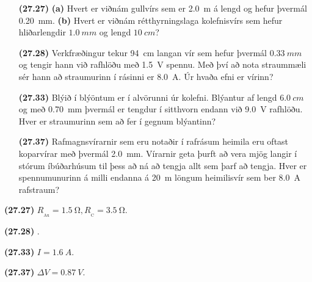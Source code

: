 \ifdefined \wholebook \else\documentclass[oneside]{book}\usepackage{EdlBook}\graphicspath{{figures/}}
\begin{document}
\begin{enumerate}[label = \textbf{(\alph*)}]

\item[\textbf{(27.27)}] \textbf{(a)} Hvert er viðnám gullvírs sem er \SI{2.0}{m} á lengd og hefur þvermál \SI{0.20}{mm}. \textbf{(b)} Hvert er viðnám rétthyrningslaga kolefnisvírs sem hefur hliðarlengdir $\SI{1.0}{mm}$ og lengd $\SI{10}{cm}$? 

\item[\textbf{(27.28)}] Verkfræðingur tekur \SI{94}{cm} langan vír sem hefur þvermál $\SI{0.33}{mm}$ og tengir hann við rafhlöðu með \SI{1.5}{V} spennu. Með því að nota straummæli sér hann að straumurinn í rásinni er \SI{8.0}{A}. Úr hvaða efni er vírinn?

\item[\textbf{(27.33)}] Blýið í blýöntum er í alvörunni úr kolefni. Blýantur af lengd $\SI{6.0}{cm}$ og með \SI{0.70}{mm} þvermál er tengdur í sitthvorn endann við \SI{9.0}{V} rafhlöðu. Hver er straumurinn sem að fer í gegnum blýantinn?

\item[\textbf{(27.37)}] Rafmagnsvírarnir sem eru notaðir í rafrásum heimila eru oftast koparvírar með þvermál \SI{2.0}{mm}. Vírarnir geta þurft að vera mjög langir í stórum íbúðarhúsum til þess að ná að tengja allt sem þarf að tengja. Hver er spennumunurinn á milli endanna á \SI{20}{m} löngum heimilisvír sem ber \SI{8.0}{A} rafstraum?

\end{enumerate}

\begin{tcolorbox}
\begin{enumerate*}[label = \vspace{0.1cm}]
  \item \textbf{(27.27)} $R_{\!_{\text{Au}}} = \SI{1.5}{\ohm}, R_{\!_{\text{C}}} = \SI{3.5}{\ohm}$.
  \item \textbf{(27.28)} .
  \item \textbf{(27.33)} $I = \SI{1.6}{A}$.
  \item \textbf{(27.37)} $\Delta V = \SI{0.87}{V}$.
\end{enumerate*}
\end{tcolorbox}

\newpage


\ifdefined \wholebook \else
 \printindex
\end{document}

